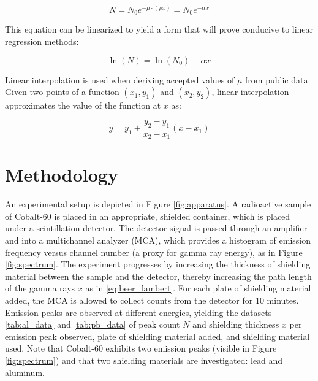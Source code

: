 \documentclass[11pt]{article}
\begin{document}
\begin{equation}
  \label{eq:num_beer_lambert}
  N = N_0 e^{-\mu \cdot (\rho x)} = N_0 e^{-\alpha x}
\end{equation}

This equation
can be linearized to yield a form that will prove conducive to linear
regression methods:

\begin{equation}
  \ln(N) = \ln(N_0) - \alpha x
  \label{eq:lin_reg}
\end{equation}

Linear interpolation is used when deriving accepted values of $\mu$
from public data. Given two points of
a function $(x_1, y_1)$ and $(x_2, y_2)$, linear interpolation
approximates the value of the function at $x$ as:

\begin{equation}
  y = y_1 + \frac{y_2 - y_1}{x_2 - x_1} (x - x_1)
  \label{eq:lin_interp}
\end{equation}

\section{Methodology}

An experimental setup is depicted in Figure \ref{fig:apparatus}. A
radioactive sample of Cobalt-60 is placed in an appropriate, shielded
container, which
is placed under a scintillation detector. The detector signal is
passed through
an amplifier and into a multichannel analyzer (MCA), which provides
a histogram
of emission frequency versus channel number (a proxy for gamma ray
energy), as in Figure \ref{fig:spectrum}. The experiment progresses
by increasing the thickness of shielding material between the sample
and the detector, thereby increasing the path length of the gamma
rays $x$ as in
\eqref{eq:beer_lambert}. For each plate of shielding material added,
the MCA is allowed to collect counts from the detector for 10
minutes. Emission peaks are observed at different energies, yielding the
datasets \ref{tab:al_data} and \ref{tab:pb_data} of peak count $N$
and shielding thickness
$x$ per emission peak observed, plate of shielding material added, and shielding
material used. Note that Cobalt-60 exhibits two emission peaks (visible in
Figure \ref{fig:spectrum}) and that two shielding materials are investigated:
lead and aluminum.

\end{document}
